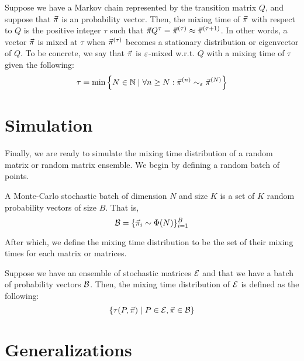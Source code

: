 \begin{definition}
Suppose we have a Markov chain represented by the transition matrix $Q$, and suppose that $\vec{\pi}$ is an probability vector.
Then, the mixing time of $\vec{\pi}$ with respect to $Q$ is the positive integer $\tau$ such that $\vec{\pi} Q^\tau = \vec{\pi}^{(\tau)} \approx \vec{\pi}^{(\tau + 1)}$.
In other words, a vector $\vec{\pi}$ is mixed at $\tau$ when $\vec{\pi}^{(\tau)}$ becomes a stationary distribution or eigenvector of $Q$.
To be concrete, we say that $\vec{\pi}$ is $\varepsilon$-mixed w.r.t. $Q$ with a mixing time of $\tau$ given the following:
$$\tau = \min\left\{ N \in \mathbb{N} \mid \forall n \geq N : \vec{\pi}^{(n)} \sim_{\varepsilon} \vec{\pi}^{(N)} \right\} $$
\end{definition}




\section{Simulation}

Finally, we are ready to simulate the mixing time distribution of a random matrix or random matrix ensemble.
We begin by defining a random batch of points.

\begin{definition}
A Monte-Carlo stochastic batch of dimension $N$ and size $K$ is a set of $K$ random probability vectors of size $B$. That is,
$$\mathcal{B} = \{\vec{\pi}_i \sim \Phi(N) \}_{i = 1}^{B}$$
\end{definition}

After which, we define the mixing time distribution to be the set of their mixing times for each matrix or matrices.

\begin{definition}
Suppose we have an ensemble of stochastic matrices $\mathcal{E}$ and that we have a batch of probability vectors $\mathcal{B}$.
Then, the mixing time distribution of $\mathcal{E}$ is defined as the following:
$$\{\tau(P, \vec{\pi}) \mid P \in \mathcal{E}, \vec{\pi} \in \mathcal{B} \}$$
\end{definition}


\section{Generalizations}

